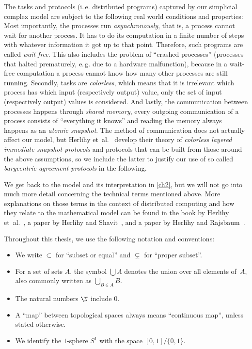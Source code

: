 The tasks and protocols (i.\,e. distributed programs) captured by our simplicial
complex model are subject to the following real world conditions and properties:
Most importantly, the processes run \emph{asynchronously}, that is, a process
cannot wait for another process. It has to do its computation in a finite number
of steps with whatever information it got up to that point. Therefore, such
programs are called \emph{wait-free}. This also includes the problem of
\enquote{crashed processes} (processes that halted prematurely, e.\,g. due to
a hardware malfunction), because in a wait-free computation a process cannot
know how many other processes are still running. Secondly, tasks are
\emph{colorless}, which means that it is irrelevant which process has which
input (respectively output) value, only the set of input (respectively output)
values is considered. And lastly, the communication between processes happens
through \emph{shared memory}, every outgoing communication of a process consists
of \enquote{everything it knows} and reading the memory always happens as an
\emph{atomic snapshot}. The method of communication does not actually affect
our model, but Herlihy et~al.~\cite{bookc:herlihyetal13} develop their theory of
\emph{colorless layered immediate snapshot \mbox{protocols}} and protocols that can be
built from those around the above assumptions, so we include the latter to
justify our use of so called \emph{barycentric agreement protocols} in the
following.

We get back to the model and its interpretation in \cref{ch2}, but we will not
go into much more detail concerning the technical terms mentioned above.
More explanations on those terms in the context of distributed computing and how
they relate to the mathematical model can be found in the book by
Herlihy et~al.~\cite{bookc:herlihyetal13}, a paper by
Herlihy and Shavit~\cite{paper:herlihyshavit99}, and a paper by
Herlihy and Rajsbaum~\cite{paper:herlihyrajsbaum03}.

\bigskip
Throughout this thesis, we use the following notation and conventions:
\begin{itemize}
    \item
        We write $\subset$ for \enquote{subset or equal}
        and $\subsetneq$ for \enquote{proper subset}.
        
    \item
        For a set of sets $A$, the symbol $\bigcup A$ denotes the
        union over all elements of~$A$, also commonly written as
        $\bigcup_{B\in A} B$.
        
    \item
        The natural numbers $\N$ include $0$.
        
    \item
        A \enquote{map} between topological spaces always means
        \enquote{continuous map}, unless stated otherwise.
        
    \item
        We identify the $1$-sphere $S^1$ with the space $[0,1]/\{0,1\}$.
\end{itemize}

